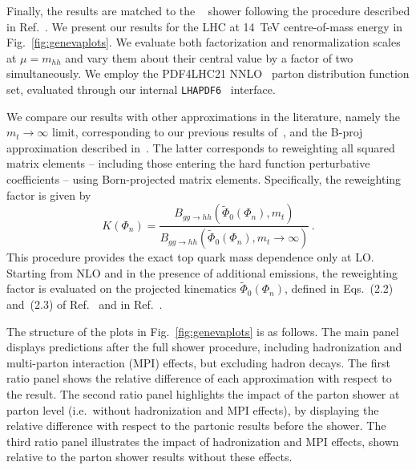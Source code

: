 Finally, the \geneva results are matched to the \pythiaEight~\cite{Sjostrand:2014zea} shower
following the procedure described in Ref.~\cite{Alioli:2022dkj}.
We present our results for the LHC at 14~TeV centre-of-mass energy in Fig.~\ref{fig:genevaplots}.
We evaluate both factorization and renormalization scales at $\mu=m_{hh}$ and vary them about
their central value by a factor of two simultaneously.
We employ the PDF4LHC21 NNLO~\cite{PDF4LHCWorkingGroup:2022cjn} parton distribution function set, evaluated through
our internal \texttt{LHAPDF6}~\cite{Buckley:2014ana} interface.


We compare our \ftapprox results with other approximations in the literature,
namely the $m_t\to\infty$ limit, corresponding to our previous results of~\cite{Alioli:2022dkj},
and the B-proj approximation described in~\cite{Grazzini:2018bsd}.
The latter corresponds to reweighting all squared matrix elements
-- including those entering the hard function perturbative coefficients -- using
Born-projected matrix elements. Specifically, the reweighting factor is given by
\begin{equation}
  \label{eq:bprojkfact}
  K(\Phi_n) = \frac{B_{gg\to hh}\left(\tilde{\Phi}_0(\Phi_n),m_t\right)}
  {B_{gg\to hh}\left(\tilde{\Phi}_0(\Phi_n),m_t\to\infty\right)}\,.
\end{equation}
This procedure provides the exact top quark mass dependence only at LO.
Starting from NLO and in the presence of additional emissions,
the reweighting factor is evaluated on the projected kinematics $\tilde{\Phi}_0(\Phi_n)$,
defined in Eqs.~(2.2) and~(2.3) of Ref.~\cite{Grazzini:2018bsd} and in Ref.~\cite{Catani:2015vma}.



The structure of the plots in Fig.~\ref{fig:genevaplots} is as follows.
The main panel displays
predictions after the full shower procedure, including hadronization
and multi-parton interaction (MPI) effects, but excluding hadron decays.
The first ratio panel shows the relative difference of each approximation with respect to the
\ftapprox result.
The second ratio panel highlights the impact of the parton shower at parton level (i.e.\ without
hadronization and MPI effects), by displaying the relative difference with respect to the
partonic results before the shower.
The third ratio panel illustrates the impact of hadronization and MPI effects,
shown relative to the parton shower results without these effects.

